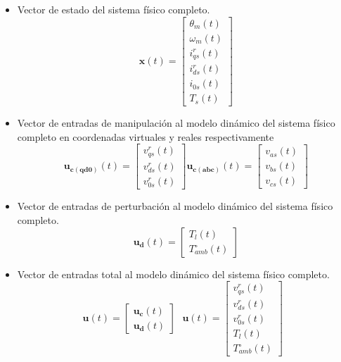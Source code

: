 \documentclass[a4paper, 10pt, onecolumn,journal]{ieeeconf}
\begin{document}
\begin{itemize}
    \item Vector de estado del sistema físico completo.
    \begin{equation}
        \mathbf{x}(t) = \begin{bmatrix} \theta_m(t) \\ \omega_m(t) \\ i^r_{qs}(t) \\ i^r_{ds}(t) \\ i_{0s}(t) \\ T_s(t) \end{bmatrix}
        \label{vector de estado del sistema}
    \end{equation}
    \item Vector de entradas de manipulación al modelo dinámico del sistema físico completo en coordenadas virtuales y reales respectivamente
    \begin{equation}
        \mathbf{u_{c(qd0)}}(t) = \begin{bmatrix} v^r_{qs}(t) \\ v^r_{ds}(t) \\ v^r_{0s}(t)\end{bmatrix}
        \mathbf{u_{c(abc)}}(t) = \begin{bmatrix} v_{as}(t) \\ v_{bs}(t) \\ v_{cs}(t)\end{bmatrix}
        \label{vector de entradas de control}
    \end{equation}
    \item Vector de entradas de perturbación al modelo dinámico del sistema físico completo.
    \begin{equation}
        \mathbf{u_{d}}(t) = \begin{bmatrix} T_l(t) \\ T_{amb}^{\circ}(t)\end{bmatrix}
        \label{vector de entradas de perturbacion}
    \end{equation}
    \item Vector de entradas total al modelo dinámico del sistema físico completo.
    \begin{equation}
        \mathbf{u}(t) = \begin{bmatrix} \mathbf{u_c}(t) \\ \mathbf{u_d}(t)\end{bmatrix} \, \, \, \,
        \mathbf{u}(t) = \begin{bmatrix} v^r_{qs}(t) \\ v^r_{ds}(t) \\ v^r_{0s}(t) \\ T_l(t) \\ T_{amb}^{\circ}(t) \end{bmatrix}\, \, \, \,

\end{equation}
\end{itemize}
\end{document}
